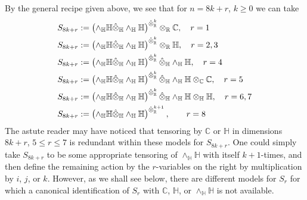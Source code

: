 \documentclass[openany, 11pt]{article}
\theoremstyle{definition}
\theoremstyle{remark}
\def\lp{\ensuremath{\left(}}
\def\rp{\ensuremath{\right)}}
\def\bC{\ensuremath{\mathbb{C}}}
\def\bH{\ensuremath{\mathbb{H}}}
\def\bR{\ensuremath{\mathbb{R}}}
\begin{document}
By the general recipe given above, we see that for $n=8k+r$, $k\geq0$ we can take
\begin{align*}
    S_{8k+r}&:=\lp \wedge_{\bH}\bH\hat{\otimes}_{\bH}\wedge_{\bH}\bH\rp^{\hat{\otimes}^k_{\bR}}\otimes_{\bR}\bC,\quad r=1\\
    S_{8k+r}&:=\lp \wedge_{\bH}\bH\hat{\otimes}_{\bH}\wedge_{\bH}\bH\rp^{\hat{\otimes}^k_{\bR}}\otimes_{\bR}\bH,\quad r=2,3\\
    S_{8k+r}&:=\lp \wedge_{\bH}\bH\hat{\otimes}_{\bH}\wedge_{\bH}\bH\rp^{\hat{\otimes}^k_{\bR}}\hat{\otimes}_{\bH}\wedge_{\bH}\bH,\quad r=4\\
    S_{8k+r}&:=\lp \wedge_{\bH}\bH\hat{\otimes}_{\bH}\wedge_{\bH}\bH\rp^{\hat{\otimes}^k_{\bR}}\hat{\otimes}_{\bH}\wedge_{\bH}\bH\otimes_{\bC}\bC,\quad r=5\\
    S_{8k+r}&:=\lp \wedge_{\bH}\bH\hat{\otimes}_{\bH}\wedge_{\bH}\bH\rp^{\hat{\otimes}^k_{\bR}}\hat{\otimes}_{\bH}\wedge_{\bH}\bH\otimes_{\bH}\bH,\quad r=6,7\\
    S_{8k+r}&:=\lp \wedge_{\bH}\bH\hat{\otimes}_{\bH}\wedge_{\bH}\bH\rp^{\hat{\otimes}^{k+1}_{\bR}},\quad\quad r=8
\end{align*}
The astute reader may have noticed that tensoring by $\bC$ or $\bH$ in dimensions $8k+r$, $5\leq r\leq 7$ is redundant within these models for $S_{8k+r}$. One could simply take $S_{8k+r}$ to be some appropriate tensoring of $\wedge_{\bH}\bH$ with itself $k+1$-times, and then define the remaining action by the $r$-variables on the right by multiplication by $i$, $j$, or $k$. However, as we shall see below, there are different models for $S_r$ for which a canonical identification of $S_r$ with $\bC$, $\bH$, or $\wedge_{\bH}\bH$ is not available. 
\end{document}
